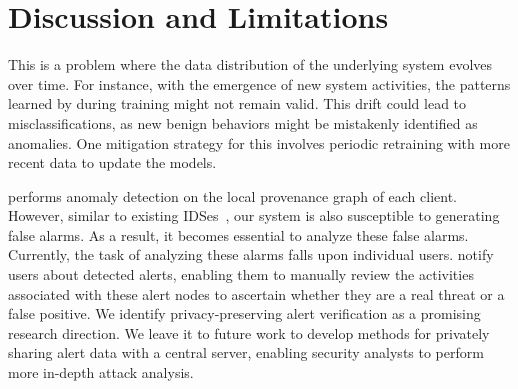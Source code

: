 \section{Discussion and Limitations}
\label{sec:discussion}




 This is a problem where the data distribution of the underlying system evolves over time. For instance, with the emergence of new system activities, the patterns learned by \Sys during training might not remain valid. This drift could lead to misclassifications, as new benign behaviors might be mistakenly identified as anomalies. One mitigation strategy for this involves periodic retraining with more recent data to update the models. 

 \Sys performs anomaly detection on the local provenance graph of each client. However, similar to existing IDSes~\cite{flash2024,cheng2023kairos,wang2022threatrace}, our system is also susceptible to generating false alarms. As a result, it becomes essential to analyze these false alarms. Currently, the task of analyzing these alarms falls upon individual users. \Sys notify users about detected alerts, enabling them to manually review the activities associated with these alert nodes to ascertain whether they are a real threat or a false positive. We identify privacy-preserving alert verification as a promising research direction. We leave it to future work to develop methods for privately sharing alert data with a central server, enabling security analysts to perform more in-depth attack analysis.


